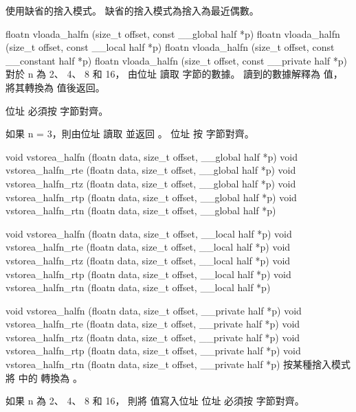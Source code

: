  使用缺省的捨入模式。
缺省的捨入模式為捨入為最近偶數。
\stopbuffer

floatn vloada_halfn (size_t offset,
	const __global half *p)
floatn vloada_halfn (size_t offset,
	const __local half *p)
floatn vloada_halfn (size_t offset,
	const __constant half *p)
floatn vloada_halfn (size_t offset,
	const __private half *p)
\stopbuffer
{}
對於 n 為 2、 4、 8 和 16，
由位址  讀取
  字節的數據。
讀到的數據解釋為  值，將其轉換為  值後返回。

位址  必須按
  字節對齊。

如果 n = 3，則由位址  讀取
  並返回 。
位址  按
  字節對齊。
\stopbuffer

void vstorea_halfn (floatn data,
	size_t offset,
	__global half *p)
void vstorea_halfn_rte (floatn data,
	size_t offset,
	__global half *p)
void vstorea_halfn_rtz (floatn data,
	size_t offset,
	__global half *p)
void vstorea_halfn_rtp (floatn data,
	size_t offset,
	__global half *p)
void vstorea_halfn_rtn (floatn data,
	size_t offset,
	__global half *p)

void vstorea_halfn (floatn data,
	size_t offset,
	__local half *p)
void vstorea_halfn_rte (floatn data,
	size_t offset,
	__local half *p)
void vstorea_halfn_rtz (floatn data,
	size_t offset,
	__local half *p)
void vstorea_halfn_rtp (floatn data,
	size_t offset,
	__local half *p)
void vstorea_halfn_rtn (floatn data,
	size_t offset,
	__local half *p)

void vstorea_halfn (floatn data,
	size_t offset,
	__private half *p)
void vstorea_halfn_rte (floatn data,
	size_t offset,
	__private half *p)
void vstorea_halfn_rtz (floatn data,
	size_t offset,
	__private half *p)
void vstorea_halfn_rtp (floatn data,
	size_t offset,
	__private half *p)
void vstorea_halfn_rtn (floatn data,
	size_t offset,
	__private half *p)
\stopbuffer
{}
按某種捨入模式將  中的  轉換為 。

如果 n 為 2、 4、 8 和 16，
則將  值寫入位址 
位址  必須按
  字節對齊。

